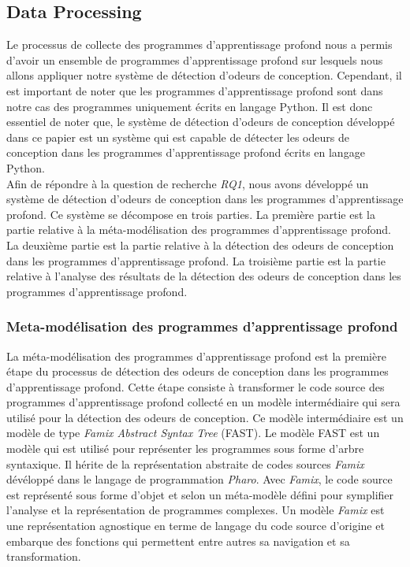 \subsection{Data Processing}
\label{sec:Data Processing}
Le processus de collecte des programmes d'apprentissage profond nous a permis
d'avoir un ensemble de programmes d'apprentissage profond sur lesquels nous
allons appliquer notre système de détection d'odeurs de conception. Cependant,
il est important de noter que les programmes d'apprentissage profond sont dans
notre cas des programmes uniquement écrits en langage Python. Il est donc
essentiel de noter que, le système de détection d'odeurs de conception développé
dans ce papier est un système qui est capable de détecter les odeurs de
conception dans les programmes d'apprentissage profond écrits en langage
Python.\\

Afin de répondre à la question de recherche \emph{RQ1}, nous avons développé un système de détection d'odeurs de
conception dans les programmes d'apprentissage profond. Ce système se décompose
en trois parties. La première partie est la partie relative à la
méta-modélisation des programmes d'apprentissage profond. La
deuxième partie est la partie relative à la détection des odeurs de conception
dans les programmes d'apprentissage profond. La troisième partie est la partie
relative à l'analyse des résultats de la détection des odeurs de conception dans
les programmes d'apprentissage profond.

\subsubsection{Meta-modélisation des programmes d'apprentissage profond}
\label{sec:Meta-modélisation des programmes d'apprentissage profond}
La méta-modélisation des programmes d'apprentissage profond est la première
étape du processus de détection des odeurs de conception dans les programmes
d'apprentissage profond. Cette étape consiste à transformer le code source des programmes
d'apprentissage profond collecté en un modèle intermédiaire qui sera utilisé pour la
détection des odeurs de conception. Ce modèle intermédiaire est un modèle de
type \emph{Famix Abstract Syntax Tree} (FAST). Le modèle FAST est un modèle qui
est utilisé pour représenter les programmes sous forme d'arbre syntaxique. Il
hérite de la représentation abstraite de codes sources \emph{Famix} dévéloppé
dans le langage de programmation \emph{Pharo}. Avec \emph{Famix}, le code
source est représenté sous forme d'objet et selon un méta-modèle défini pour symplifier l'analyse et
la représentation de programmes complexes. Un modèle \emph{Famix} est une
représentation agnostique en terme de langage du code source d'origine et embarque des
fonctions qui permettent entre autres sa navigation et sa transformation.\\


